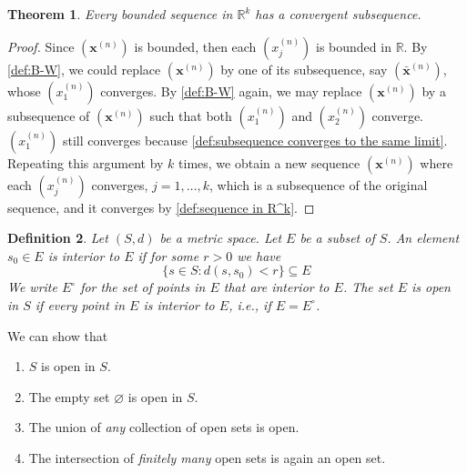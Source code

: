 \documentclass[12pt, lettersize]{book}
\newtheorem{thm}{Theorem}[section]
\newtheorem{dfn}[thm]{Definition}
\let\emptyset\varnothing
\begin{document}
		\begin{thm}
		Every bounded sequence in $\mathbb{R}^k$ has a convergent subsequence.
		\end{thm}
		\begin{proof}
		Since $(\textbf{x}^{(n)})$ is bounded, then each $(x_j^{(n)})$ is bounded in $\mathbb{R}$. By \ref{def:B-W}, we
		could replace $(\textbf{x}^{(n)})$ by one of its subsequence, say $(\bar{\mathbf{x}}^{(n)})$, whose $(x_1^{(n)})$
		converges. By \ref{def:B-W} again, we may replace $(\textbf{x}^{(n)})$ by a subsequence of $(\textbf{x}^{(n)})$ such
		that both $(x_1^{(n)})$ and $(x_2^{(n)})$ converge. $(x_1^{(n)})$ still converges because \ref{def:subsequence converges to the same limit}. Repeating this argument by $k$ times, we obtain a new sequence $(\textbf{x}^{(n)})$ where each $(x_j^{(n)})$ converges, $j=1,\dots,k$, which is a subsequence of the original sequence, and it converges by \ref{def:sequence in R^k}. 
		\end{proof}
		
		\begin{dfn}
		Let $(S,d)$ be a metric space. Let $E$ be a subset of $S$. An element $s_0\in E$ is \emph{interior} to $E$ if for some $r>0$ we have
		\begin{displaymath}
			\{s\in S: d(s,s_0)<r\}\subseteq E
		\end{displaymath}
		We write $E^\circ$ for the set of points in $E$ that are interior to $E$. The set $E$ is \emph{open} in $S$ if every point in $E$ is interior to $E$, i.e., if $E=E^\circ$.
		\end{dfn}
		We can show that
		\begin{enumerate}
			\item $S$ is open in $S$.
			\item The empty set $\emptyset$ is open in $S$.
			\item The union of \emph{any} collection of open sets is open.
			\item The intersection of \emph{finitely many} open sets is again an open set.
		\end{enumerate}
		
\end{document}
